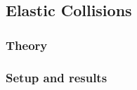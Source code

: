 \documentclass{article}
\begin{document}
\newpage

\subsection{Elastic Collisions}
\subsubsection{Theory}
\subsubsection{Setup and results}


\end{document}
